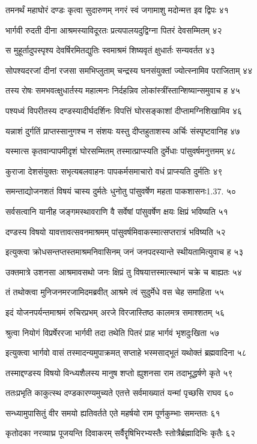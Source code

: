 तमनर्थं महाघोरं दण्डः कृत्वा सुदारुणम्
नगरं स्वं जगामाशु मदोन्मत्त इव द्विपः ४१

भार्गवी रुदती दीना आश्रमस्याविदूरतः
प्रत्यपालयदुद्विग्ना पितरं देवसम्मितम् ४२

स मुहूर्तादुपस्पृश्य देवर्षिरमितद्युतिः
स्वमाश्रमं शिष्यवृतं क्षुधार्तः सन्यवर्तत ४३

सोपश्यदरजां दीनां रजसा समभिप्लुताम्
चन्द्रस्य घनसंयुक्तां ज्योत्स्नामिव पराजिताम् ४४

तस्य रोषः समभवत्क्षुधार्तस्य महात्मनः
निर्दहन्निव लोकांस्त्रींस्तान्शिष्यान्समुवाच ह ४५

पश्यध्वं विपरीतस्य दण्डस्यादीर्घदर्शिनः
विपत्तिं घोरसङ्काशां दीप्तामग्निशिखामिव ४६

यन्नाशं दुर्गतिं प्राप्तस्सानुगश्च न संशयः
यस्तु दीप्तहुताशस्य अर्चिः संस्पृष्टवानिह ४७

यस्मात्स कृतवान्पापमीदृशं घोरसम्मितम्
तस्मात्प्राप्स्यति दुर्मेधाः पांसुवर्षमनुत्तमम् ४८

कुराजा देशसंयुक्तः सभृत्यबलवाहनः
पापकर्मसमाचारो वधं प्राप्स्यति दुर्मतिः ४९

समन्ताद्योजनशतं विषयं चास्य दुर्मतेः
धुनोतु पांसुवर्षेण महता पाकशासनः1.37. ५०

सर्वसत्वानि यानीह जङ्गमस्थावराणि वै
सर्वेषां पांसुवर्षेण क्षयः क्षिप्रं भविष्यति ५१

दण्डस्य विषयो यावत्तावत्सवनमाश्रमम्
पांसुवर्षमिवाकस्मात्सप्तरात्रं भविष्यति ५२

इत्युक्त्वा क्रोधसन्तप्तस्तमाश्रमनिवासिनम्
जनं जनपदस्यान्ते स्थीयतामित्युवाच ह ५३

उक्तमात्रे उशनसा आश्रमावसथो जनः
क्षिप्रं तु विषयात्तस्मात्स्थानं चक्रे च बाह्यतः ५४

तं तथोक्त्वा मुनिजनमरजामिदमब्रवीत्
आश्रमे त्वं सुदुर्मेधे वस चेह समाहिता ५५

इदं योजनपर्यन्तमाश्रमं रुचिरप्रभम्
अरजे विरजास्तिष्ठ कालमत्र समाश्शतम् ५६

श्रुत्वा नियोगं विप्रर्षेररजा भार्गवी तदा
तथेति पितरं प्राह भार्गवं भृशदुःखिता ५७

इत्युक्त्वा भार्गवो वासं तस्मादन्यमुपाक्रमत्
सप्ताहे भस्मसाद्भूतं यथोक्तं ब्रह्मवादिना ५८

तस्माद्दण्डस्य विषयो विन्ध्यशैलस्य मानुष
शप्तो ह्युशनसा राम तदाभूद्धर्षणे कृते ५९

ततःप्रभृति काकुत्स्थ दण्डकारण्यमुच्यते
एतत्ते सर्वमाख्यातं यन्मां पृच्छसि राघव ६०

सन्ध्यामुपासितुं वीर समयो ह्यतिवर्तते
एते महर्षयो राम पूर्णकुम्भाः समन्ततः ६१

कृतोदका नरव्याघ्र पूजयन्ति दिवाकरम्
सर्वैरॄषिभिरभ्यस्तैः स्तोत्रैर्ब्रह्मादिभिः कृतैः ६२

